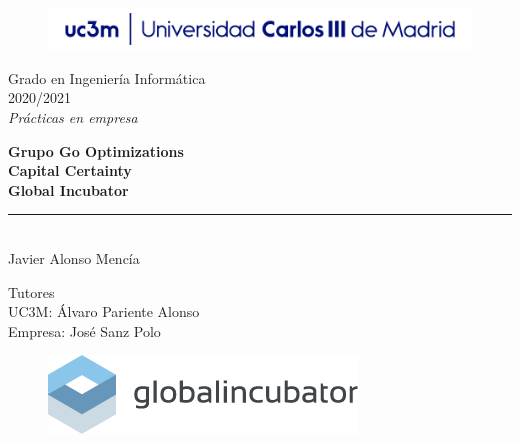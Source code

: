 \documentclass[a4paper,12pt]{article}
\begin{document}
\begin{titlepage}
\begin{sffamily}
\color{azulUC3M}
\begin{center}
\begin{figure}[htb]
\begin{center}
\vspace*{0.6cm}
\includegraphics[width=15cm]{imagenes/Portada_Logo.png}
\vspace*{1.6cm}
\end{center}
\end{figure}
\begin{LARGE}
Grado en Ingeniería Informática \\%
2020/2021 \\%
\vspace*{2cm}
\textsl{Prácticas en empresa}\\
\end{LARGE}

\begin{huge}
\textbf{Grupo Go Optimizations \\  Capital Certainty \\ Global Incubator} \\
\rule{80mm}{0.1mm}\\
\vspace*{1cm}
Javier Alonso Mencía %
\end{huge}

\vspace*{1cm}
\begin{Large}
Tutores\\
UC3M: Álvaro Pariente Alonso  \\
Empresa: José Sanz Polo

\end{Large}
\end{center}
\vspace*{1cm}
\color{black}
\begin{figure}
\begin{center}
\includegraphics[scale=0.7]{logo.png}\\
\end{center}
\end{figure}


\end{sffamily}
\end{titlepage}
\end{document}
